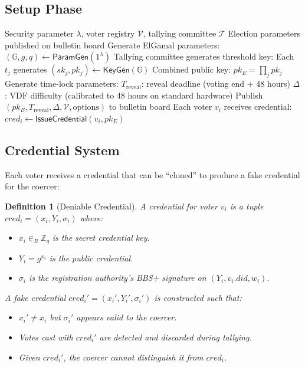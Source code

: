 \documentclass[11pt,a4paper]{article}
\newcommand{\GG}{\mathbb{G}}
\newcommand{\ZZ}{\mathbb{Z}}
\newcommand{\secparam}{\lambda}
\newtheorem{definition}{Definition}
\begin{document}
\subsection{Setup Phase}

\begin{algorithm}[H]
\caption{Election Setup}
\label{alg:setup}
\begin{algorithmic}[1]
\Require Security parameter $\secparam$, voter registry $\mathcal{V}$, tallying committee $\mathcal{T}$
\Ensure Election parameters published on bulletin board
\State Generate ElGamal parameters: $(\GG, g, q) \leftarrow \mathsf{ParamGen}(1^\secparam)$
\State Tallying committee generates threshold key:
\State \quad Each $t_j$ generates $(sk_j, pk_j) \leftarrow \mathsf{KeyGen}(\GG)$
\State \quad Combined public key: $pk_E = \prod_j pk_j$
\State Generate time-lock parameters:
\State \quad $T_{\text{reveal}}$: reveal deadline (voting end + 48 hours)
\State \quad $\Delta$: VDF difficulty (calibrated to 48 hours on standard hardware)
\State Publish $(pk_E, T_{\text{reveal}}, \Delta, \mathcal{V}, \text{options})$ to bulletin board
\State Each voter $v_i$ receives credential: $\mathit{cred}_i \leftarrow \mathsf{IssueCredential}(v_i, pk_E)$
\end{algorithmic}
\end{algorithm}

\subsection{Credential System}

Each voter receives a credential that can be ``cloned'' to produce a fake credential for the coercer:

\begin{definition}[Deniable Credential]
A credential for voter $v_i$ is a tuple $\mathit{cred}_i = (x_i, Y_i, \sigma_i)$ where:
\begin{itemize}
    \item $x_i \in_R \ZZ_q$ is the secret credential key.
    \item $Y_i = g^{x_i}$ is the public credential.
    \item $\sigma_i$ is the registration authority's BBS+ signature on $(Y_i, v_i.\mathit{did}, w_i)$.
\end{itemize}
A \emph{fake credential} $\mathit{cred}_i' = (x_i', Y_i', \sigma_i')$ is constructed such that:
\begin{itemize}
    \item $x_i' \neq x_i$ but $\sigma_i'$ appears valid to the coercer.
    \item Votes cast with $\mathit{cred}_i'$ are detected and discarded during tallying.
    \item Given $\mathit{cred}_i'$, the coercer cannot distinguish it from $\mathit{cred}_i$.
\end{itemize}
\end{definition}
\end{document}
